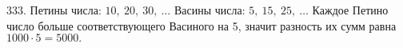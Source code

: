 333. Петины числа: $10,\ 20,\ 30,\ \ldots$ Васины числа: $5,\ 15,\ 25,\ \ldots$ Каждое Петино число больше соответствующего Васиного на 5, значит разность их сумм равна $1000\cdot5=5000.$\\
